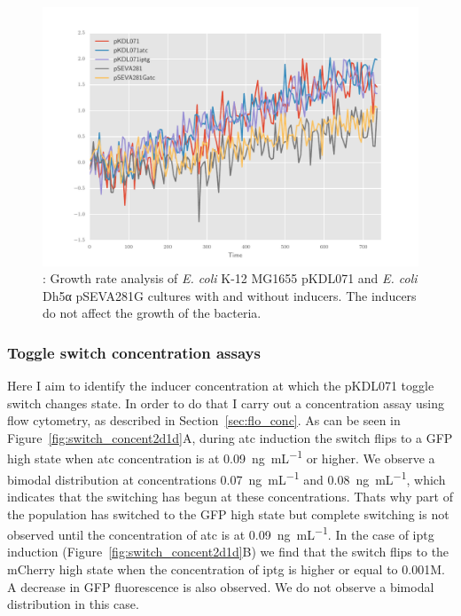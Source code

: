 \begin{figure}[tb]
	\begin{center}
		\includegraphics[scale=0.7]{../../chapters/chapterABCFlow/images/growth_curves.pdf}
		\caption[LoF caption]{\label{fig:growth_curve}: Growth rate analysis of \textit{E. coli} K-12 MG1655 pKDL071 and \textit{E. coli} Dh5α pSEVA281G cultures with and without inducers. The inducers do not affect the growth of the bacteria. }
	\end{center}
\end{figure}

\clearpage



\subsubsection{Toggle switch concentration assays}

Here I aim to identify the inducer concentration at which the pKDL071 toggle switch changes state. In order to do that I carry out a concentration assay using flow cytometry, as described in Section~\ref{sec:flo_conc}. As can be seen in Figure~\ref{fig:switch_concent2d1d}A, during \acrshort{atc} induction the switch flips to a GFP high state when \acrshort{atc} concentration is at \SI{0.09}{\nano\gram\per\milli\liter} or higher. We observe a bimodal distribution at concentrations \SI{0.07}{\nano\gram\per\milli\liter} and \SI{0.08}{\nano\gram\per\milli\liter}, which indicates that the switching has begun at these concentrations. Thats why part of the population has switched to the GFP high state but complete switching is not observed until the concentration of \acrshort{atc} is at \SI{0.09}{\nano\gram\per\milli\liter}. In the case of \acrshort{iptg} induction (Figure~\ref{fig:switch_concent2d1d}B) we find that the switch flips to the mCherry high state when the concentration of \acrshort{iptg} is higher or equal to 0.001M. A decrease in GFP fluorescence is also observed. We do not observe a bimodal distribution in this case. 


